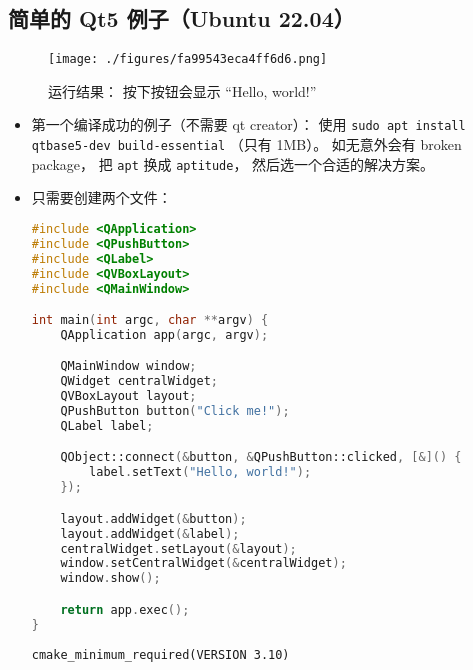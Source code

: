 \subsection{简单的 Qt5 例子（Ubuntu 22.04）}
\begin{figure}[ht]
\centering
\texttt{[image: ./figures/fa99543eca4ff6d6.png]}
\caption{运行结果： 按下按钮会显示 “Hello, world!”} \label{fig_QtInt1}
\end{figure}

\begin{itemize}
\item 第一个编译成功的例子（不需要 qt creator）： 使用 \verb|sudo apt install qtbase5-dev build-essential| （只有 1MB）。 如无意外会有 broken package， 把 \verb|apt| 换成 \verb|aptitude|， 然后选一个合适的解决方案。
\item 只需要创建两个文件：
\begin{lstlisting}[language=cpp,caption=main.cpp]
#include <QApplication>
#include <QPushButton>
#include <QLabel>
#include <QVBoxLayout>
#include <QMainWindow>

int main(int argc, char **argv) {
    QApplication app(argc, argv);

    QMainWindow window;
    QWidget centralWidget;
    QVBoxLayout layout;
    QPushButton button("Click me!");
    QLabel label;

    QObject::connect(&button, &QPushButton::clicked, [&]() {
        label.setText("Hello, world!");
    });

    layout.addWidget(&button);
    layout.addWidget(&label);
    centralWidget.setLayout(&layout);
    window.setCentralWidget(&centralWidget);
    window.show();

    return app.exec();
}
\end{lstlisting}
\begin{lstlisting}[language=none,caption=CMakeLists.txt]
cmake_minimum_required(VERSION 3.10)


\end{lstlisting}
\end{itemize}
